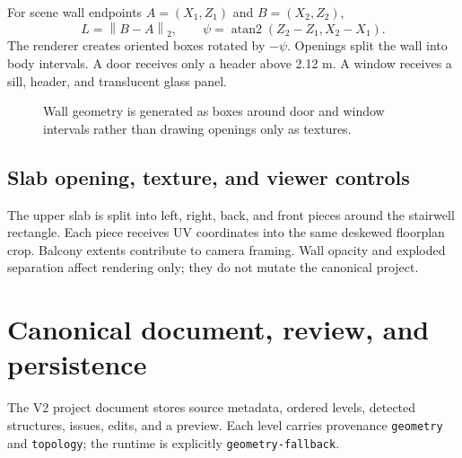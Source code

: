\documentclass[11pt,a4paper]{article}
\newcommand{\code}[1]{\texttt{#1}}
\newcommand{\norm}[1]{\left\lVert #1\right\rVert}
\begin{document}
For scene wall endpoints $A=(X_1,Z_1)$ and $B=(X_2,Z_2)$,
\begin{equation}
L=\norm{B-A}_2,\qquad
\psi=\operatorname{atan2}(Z_2-Z_1,X_2-X_1).
\end{equation}
The renderer creates oriented boxes rotated by $-\psi$. Openings split the wall into body intervals. A door receives only a header above 2.12 m. A window receives a sill, header, and translucent glass panel.

\begin{figure}[htbp]
\centering
{}
\caption{Wall geometry is generated as boxes around door and window intervals rather than drawing openings only as textures.}
\label{fig:wallmesh}
\end{figure}

\subsection{Slab opening, texture, and viewer controls}

The upper slab is split into left, right, back, and front pieces around the stairwell rectangle. Each piece receives UV coordinates into the same deskewed floorplan crop. Balcony extents contribute to camera framing. Wall opacity and exploded separation affect rendering only; they do not mutate the canonical project.

\section{Canonical document, review, and persistence}

The V2 project document stores source metadata, ordered levels, detected structures, issues, edits, and a preview. Each level carries provenance \code{geometry} and \code{topology}; the runtime is explicitly \code{geometry-fallback}.
\end{document}
